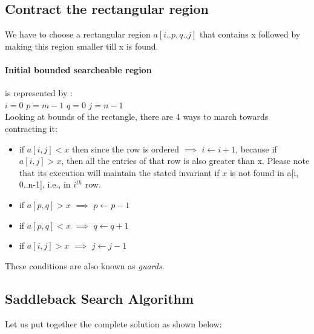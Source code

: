 \subsection{Contract the rectangular region}
We have to choose a rectangular region $a[i..p, q..j]$ that contains x followed by making this region smaller till x is found. 
\paragraph{Initial bounded searcheable region} is represented by : \\
$i = 0$\hspace{1.2mm} $p = m - 1$\hspace{1.2mm} $q = 0$\hspace{1.2mm} 
$j=n - 1$\vspace{2mm}\\
Looking at bounds of the rectangle, there are 4 ways to march towards contracting it:


\begin{itemize}
    \item if $a[i, j] < x$ then since the row is ordered $\implies$ $i \leftarrow i + 1$, because if $a[i, j] > x$, then all the entries of that row is also greater than x. Please note that its execution will maintain the stated invariant if $x$ is not found in a[i, 0..n-1], i.e., in $i^{th}$ row.
    \item if $a[p, q] > x$ $\implies$ $p \leftarrow p - 1$
    \item if $a[p, q] < x$ $\implies$ $q \leftarrow q + 1$
    \item if $a[i, j] > x$ $\implies$ $j \leftarrow j - 1$
\end{itemize}

These conditions are also known as \textit{guards}\cite{gries}.



\subsection{Saddleback Search Algorithm}
Let us put together the complete solution as shown below:


